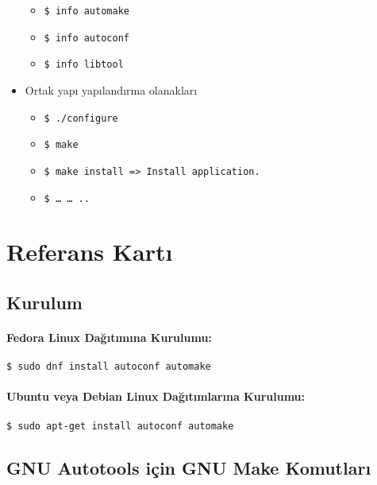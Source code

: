 \documentclass[
]{book}
\providecommand{\tightlist}{%
  \setlength{\itemsep}{0pt}\setlength{\parskip}{0pt}}
\begin{document}
\begin{itemize}
  \begin{itemize}
  \tightlist
  \item
    \texttt{\$\ info\ automake}
  \item
    \texttt{\$\ info\ autoconf}
  \item
    \texttt{\$\ info\ libtool}
  \end{itemize}
\item
  Ortak yapı yapılandırma olanakları

  \begin{itemize}
  \tightlist
  \item
    \texttt{\$\ ./configure}
  \item
    \texttt{\$\ make}
  \item
    \texttt{\$\ make\ install\ =\textgreater{}\ Install\ application.}
  \item
    \texttt{\$\ \ldots{}\ \ldots{}\ ..}
  \end{itemize}
\end{itemize}

\hypertarget{referans-kartux131}{%
\section{Referans Kartı}\label{referans-kartux131}}

\hypertarget{kurulum}{%
\subsection{Kurulum}\label{kurulum}}

\hypertarget{fedora-linux-daux11fux131tux131mux131na-kurulumu}{%
\paragraph{Fedora Linux Dağıtımına Kurulumu:}\label{fedora-linux-daux11fux131tux131mux131na-kurulumu}}

\texttt{\$\ sudo\ dnf\ install\ autoconf\ automake}

\hypertarget{ubuntu-veya-debian-linux-daux11fux131tux131mlarux131na-kurulumu}{%
\paragraph{Ubuntu veya Debian Linux Dağıtımlarına Kurulumu:}\label{ubuntu-veya-debian-linux-daux11fux131tux131mlarux131na-kurulumu}}

\texttt{\$\ sudo\ apt-get\ install\ autoconf\ automake}

\hypertarget{gnu-autotools-iuxe7in-gnu-make-komutlarux131}{%
\subsection{GNU Autotools için GNU Make Komutları}\label{gnu-autotools-iuxe7in-gnu-make-komutlarux131}}
\end{document}
